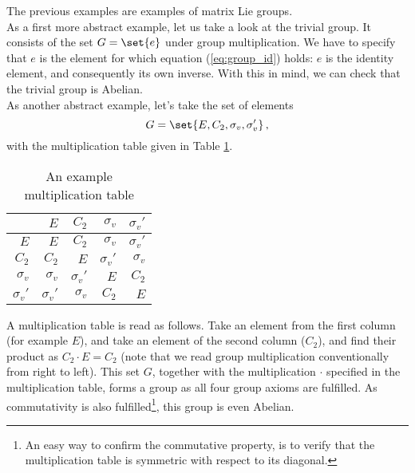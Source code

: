         The previous examples are examples of matrix Lie groups. \\
        
        As a first more abstract example, let us take a look at the trivial group. It consists of the set $G = \set{e}$ under group multiplication. We have to specify that $e$ is the element for which equation (\ref{eq:group_id}) holds: $e$ is the identity element, and consequently its own inverse. With this in mind, we can check that the trivial group is Abelian. \\

        As another abstract example, let's take the set of elements
        \begin{equation}
            G = \set{E, C_2, \sigma_v, \sigma_v'} \thinspace ,
        \end{equation}
        with the multiplication table given in Table \ref{table:multiplication_table_C2v}.
        \begin{table}[H] \centering
            \begin{tabular}{r|rrrr}
                            & $E$           & $C_2$         & $\sigma_v$    & $\sigma_v'$   \\ \hline

                $E$         & $E$           & $C_2$         & $\sigma_v$    & $\sigma_v'$   \\
                $C_2$       & $C_2$         & $E$           & $\sigma_v'$   & $\sigma_v$    \\
                $\sigma_v$  & $\sigma_v$    & $\sigma_v'$   & $E$           & $C_2$         \\
                $\sigma_v'$ & $\sigma_v'$   & $\sigma_v$    & $C_2$         & $E$
            \end{tabular}
            \caption{An example multiplication table}
            \label{table:multiplication_table_C2v}
        \end{table}
        A multiplication table is read as follows. Take an element from the first column (for example $E$), and take an element of the second column ($C_2$), and find their product as $C_2 \cdot E = C_2$ (note that we read group multiplication conventionally from right to left). This set $G$, together with the multiplication $\cdot$ specified in the multiplication table, forms a group as all four group axioms are fulfilled. As commutativity is also fulfilled\footnote{An easy way to confirm the commutative property, is to verify that the multiplication table is symmetric with respect to its diagonal.}, this group is even Abelian. \\

